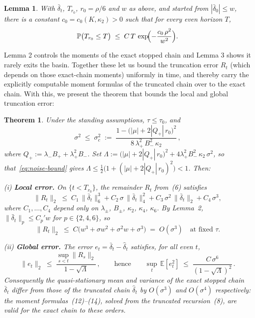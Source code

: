 \documentclass{article} %
\theoremstyle{plain}
\newtheorem{theorem}{Theorem}
\newtheorem{lemma}{Lemma}
\theoremstyle{definition}
\begin{document}
\begin{itemize}[nosep,leftmargin=*]
\begin{lemma}
With $\bar\delta_t$, $T_{r_0}$, $r_0=\rho/6$ and $w$ as above, and started from
$|\bar\delta_0|\le w$, there is a constant $c_0=c_0(K,\kappa_2)>0$ such that for
every even horizon $T$,
\[
  \mathbb{P}\bigl(T_{r_0}\le T\bigr)
  \;\le\; C\,T\,\exp\!\Bigl(-\frac{c_0\,\rho^2}{w^2}\Bigr).
\]
\end{lemma}
Lemma 2 controls the moments of the exact stopped chain and Lemma 3 shows it rarely exits the basin. Together these let us bound the truncation error $R_{t}$ (which depends on those exact-chain moments) uniformly in time, and thereby carry the explicitly computable moment formulas of the truncated chain over to the exact chain. With this, we present the theorem that bounds the local and global truncation error:


\begin{theorem}
\label{thm:truncation}
Under the standing assumptions, $\tau \le \tau_0$, and
\begin{equation}\label{eq:noise-bound}
  \sigma^2 \;\le\; \sigma_c^2
  \;:=\; \frac{1 - \bigl(|\mu| + 2|Q_+|\,r_0\bigr)^2}
             {8\,\lambda_+^2\,B_-^2\,\kappa_2}\,,
\end{equation}
where $Q_+ := \lambda_- B_+ + \lambda_+^2 B_-$. Set
$\Lambda := \bigl(|\mu|+2|Q_+|\,r_0\bigr)^2 + 4\lambda_+^2 B_-^2\,\kappa_2\,\sigma^2$,
so that~\eqref{eq:noise-bound} gives
$\Lambda \le \tfrac{1}{2}\bigl(1+(|\mu|+2|Q_+|\,r_0)^2\bigr) < 1$.
Then:

\smallskip
\noindent\textup{(i)} \textbf{Local error.}\;
On $\{t < T_{r_0}\}$, the remainder $R_t$ from~(6) satisfies
\[
  \|R_t\|_2
  \;\le\; C_1\,\|\bar\delta_t\|_6^3
       + C_2\,\sigma\,\|\bar\delta_t\|_4^2
       + C_3\,\sigma^2\,\|\bar\delta_t\|_2
       + C_4\,\sigma^3,
\]
where $C_1,\ldots,C_4$ depend only on $\lambda_\pm$, $B_\pm$, $\kappa_2$,
$\kappa_4$, $\kappa_6$. By Lemma~2,
$\|\bar\delta_t\|_p \le C_p' w$ for $p \in \{2,4,6\}$, so
\[
  \|R_t\|_2
  \;\le\; C\bigl(w^3 + \sigma w^2 + \sigma^2 w + \sigma^3\bigr)
  \;=\; O(\sigma^3)
  \quad\text{at fixed }\tau.
\]

\smallskip
\noindent\textup{(ii)} \textbf{Global error.}\;
The error $e_t = \bar\delta_t - \hat\delta_t$ satisfies, for all even $t$,
\[
  \|e_t\|_2
  \;\le\; \frac{\sup_{s<t}\|R_s\|_2}{1-\sqrt{\Lambda}}\,,
  \qquad\text{hence}\qquad
  \sup_t\,\mathbb{E}[e_t^2]
  \;\le\; \frac{C\,\sigma^6}{(1-\sqrt{\Lambda})^2}\,.
\]
Consequently the quasi-stationary mean and variance of the exact stopped chain
$\bar\delta_t$ differ from those of the truncated chain $\hat\delta_t$ by
$O(\sigma^3)$ and $O(\sigma^4)$ respectively: the moment formulas~(12)--(14),
solved from the truncated recursion~(8), are valid for the exact chain to these
orders.
\end{theorem}




\end{itemize}
\end{document}
